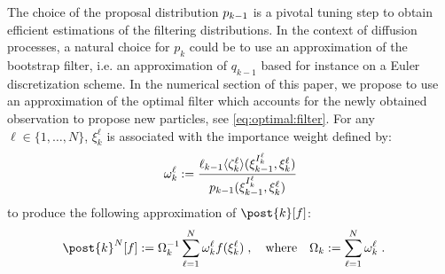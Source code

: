 \documentclass{article}
\newcommand{\N}{N}
\newcommand{\kissforward}[3][]
{\ifthenelse{\equal{#1}{}}{p_{#2}}
{\ifthenelse{\equal{#1}{fully}}{p^{\star}_{#2}}
{\ifthenelse{\equal{#1}{smooth}}{\tilde{r}_{#2}}{\mathrm{erreur}}}}}
\newcommand{\eqdef}{\ensuremath{:=}}
\newcommand{\eqsp}{\;}
\newcommand{\ewght}[2]{\ensuremath{\omega_{#1}^{#2}}}
\newcommand{\epart}[2]{\ensuremath{\xi_{#1}^{#2}}}
\newcommand{\sumwght}[2][]{%
\ifthenelse{\equal{#1}{}}{\ensuremath{\Omega_{#2}}}{\ensuremath{\Omega_{#2}^{(#1)}}}}
\newcommand{\hatqg}[1]{\mathsf{\ell}_{#1}}
\begin{document}
The choice of the proposal distribution $\kissforward{k-1}{k-1}$ is a pivotal tuning step to obtain efficient estimations of the filtering distributions. In the context of diffusion processes, a natural choice for $p_k$ could be to use an approximation of the bootstrap filter, i.e. an approximation of $q_{k-1}$ based for instance on a Euler discretization scheme. In the numerical section of this paper, we propose to use an approximation of the optimal filter which accounts for the newly obtained observation to propose new particles, see \eqref{eq:optimal:filter}. 
For any  $\ell \in\{1, \dots, \N\}$, $\epart{k}{\ell}$ is associated with the  importance weight defined by:
\begin{equation}
\label{eq:weight-update-filtering}
    \ewght{k}{\ell} \eqdef \frac{\hatqg{k-1}\langle\zeta_k^{\ell}\rangle(\epart{k-1}{I_k^{\ell}},\epart{k}{\ell}) }{ \kissforward{k-1}{k-1}(\epart{k-1}{I_k^{\ell}},\epart{k}{\ell})}
\end{equation}
to produce the following approximation of $\post{k}[f]$:
\begin{align*}
\post{k}^\N[f]&\eqdef \sumwght{k}^{-1}\sum_{\ell=1}^N \ewght{k}{\ell}f(\epart{k}{\ell})\eqsp,\quad\mbox{where}\quad\sumwght{k}\eqdef \sum_{\ell=1}^\N \ewght{k}{\ell}\eqsp.
\end{align*}
\end{document}
